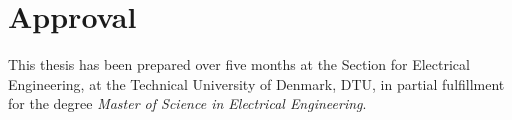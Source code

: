 \section*{Approval}
This thesis has been prepared over five months at the Section for Electrical Engineering, at the Technical University of Denmark, DTU, in partial fulfillment for the degree \emph{Master of Science in Electrical Engineering}.

\vfill

\begin{center}
\namesigdate{\thesisauthor~-~\studentnumber}
\end{center}

\vfill

